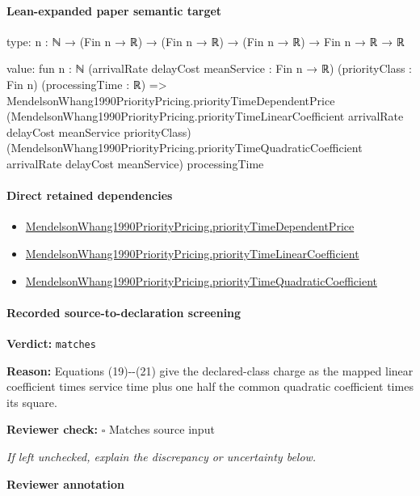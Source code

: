 \documentclass[10pt]{article}
\newcommand{\reviewerbox}{%
  \par\noindent\fbox{\parbox{0.96\linewidth}{\rule{0pt}{0.38in}}}\par
}
\newcommand{\reviewmatch}[1]{%
  \par\noindent\textbf{Reviewer check:} $\square$\; #1\par
  \noindent\emph{If left unchecked, explain the discrepancy or uncertainty below.}\par
}
\begin{document}
\paragraph{Lean-expanded paper semantic target}
\begin{ReviewVerbatim}
type:
{n : ℕ} → (Fin n → ℝ) → (Fin n → ℝ) → (Fin n → ℝ) → Fin n → ℝ → ℝ

value:
fun {n : ℕ} (arrivalRate delayCost meanService : Fin n → ℝ) (priorityClass : Fin n) (processingTime : ℝ) =>
  MendelsonWhang1990PriorityPricing.priorityTimeDependentPrice
    (MendelsonWhang1990PriorityPricing.priorityTimeLinearCoefficient arrivalRate delayCost meanService priorityClass)
    (MendelsonWhang1990PriorityPricing.priorityTimeQuadraticCoefficient arrivalRate delayCost meanService)
    processingTime
\end{ReviewVerbatim}

\paragraph{Direct retained dependencies}
\begin{itemize}\raggedright
\item \hyperlink{paper-prerequisite-60ffddd9622d7d65}{Mendelson\allowbreak{}Whang1990\allowbreak{}Priority\allowbreak{}Pricing.\allowbreak{}priority\allowbreak{}Time\allowbreak{}Dependent\allowbreak{}Price}
\item \hyperlink{paper-prerequisite-ae05cc1b41c33470}{Mendelson\allowbreak{}Whang1990\allowbreak{}Priority\allowbreak{}Pricing.\allowbreak{}priority\allowbreak{}Time\allowbreak{}Linear\allowbreak{}Coefficient}
\item \hyperlink{paper-prerequisite-1840b9f7b498b425}{Mendelson\allowbreak{}Whang1990\allowbreak{}Priority\allowbreak{}Pricing.\allowbreak{}priority\allowbreak{}Time\allowbreak{}Quadratic\allowbreak{}Coefficient}
\end{itemize}
\paragraph{Recorded source-to-declaration screening}
\textbf{Verdict:} \texttt{matches}
\\
{\raggedright
\textbf{Reason:} Equations (19)-\allowbreak{}-\allowbreak{}(21) give the declared-\allowbreak{}class charge as the mapped linear coefficient times service time plus one half the common quadratic coefficient times its square.\allowbreak{}
\par}
\reviewmatch{Matches source input}
\noindent\textbf{Reviewer annotation}\par
\reviewerbox
\clearpage
\hypertarget{paper-prerequisite-49957d909aa24bc5}{}
\end{document}
